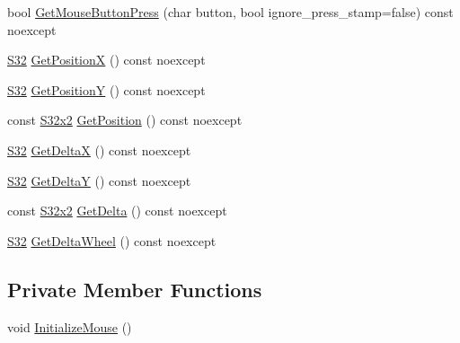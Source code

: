 \begin{DoxyCompactItemize}
bool \mbox{\hyperlink{classmage_1_1input_1_1_mouse_1_1_impl_acba58fb9b1f44679545d3453c88c0d59}{Get\+Mouse\+Button\+Press}} (char button, bool ignore\+\_\+press\+\_\+stamp=false) const noexcept
\item 
\mbox{\hyperlink{namespacemage_a642e05c5c83642b6946703615cdbf2da}{S32}} \mbox{\hyperlink{classmage_1_1input_1_1_mouse_1_1_impl_a3446d3bd42aa376e1c3d877cf24a232b}{Get\+PositionX}} () const noexcept
\item 
\mbox{\hyperlink{namespacemage_a642e05c5c83642b6946703615cdbf2da}{S32}} \mbox{\hyperlink{classmage_1_1input_1_1_mouse_1_1_impl_a5c03e19ff1a384aa6fd9ae5d7c603c9a}{Get\+PositionY}} () const noexcept
\item 
const \mbox{\hyperlink{namespacemage_a4843c424aae7bb5fb6c440ed6ed593ee}{S32x2}} \mbox{\hyperlink{classmage_1_1input_1_1_mouse_1_1_impl_acdbd3171b86d0845139d71d55ab23022}{Get\+Position}} () const noexcept
\item 
\mbox{\hyperlink{namespacemage_a642e05c5c83642b6946703615cdbf2da}{S32}} \mbox{\hyperlink{classmage_1_1input_1_1_mouse_1_1_impl_a61e7ce497a1779fcd58bce1bf067abfe}{Get\+DeltaX}} () const noexcept
\item 
\mbox{\hyperlink{namespacemage_a642e05c5c83642b6946703615cdbf2da}{S32}} \mbox{\hyperlink{classmage_1_1input_1_1_mouse_1_1_impl_accce0b038c380bf32625de965a83e1db}{Get\+DeltaY}} () const noexcept
\item 
const \mbox{\hyperlink{namespacemage_a4843c424aae7bb5fb6c440ed6ed593ee}{S32x2}} \mbox{\hyperlink{classmage_1_1input_1_1_mouse_1_1_impl_aa255160dc9930673d94672ae1e9f43e8}{Get\+Delta}} () const noexcept
\item 
\mbox{\hyperlink{namespacemage_a642e05c5c83642b6946703615cdbf2da}{S32}} \mbox{\hyperlink{classmage_1_1input_1_1_mouse_1_1_impl_ad2cd4f1d06038ab71e9db2802598bd16}{Get\+Delta\+Wheel}} () const noexcept
\end{DoxyCompactItemize}
\subsection*{Private Member Functions}
\begin{DoxyCompactItemize}
\item 
void \mbox{\hyperlink{classmage_1_1input_1_1_mouse_1_1_impl_ae290eaa8d1db619a3123f88e452d382a}{Initialize\+Mouse}} ()
\end{DoxyCompactItemize}
